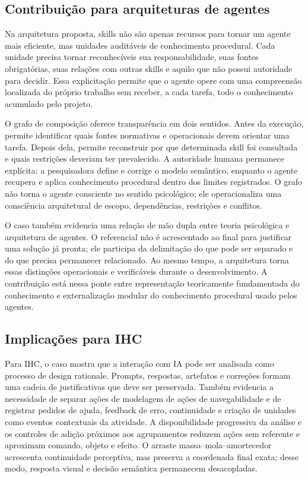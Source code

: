 \documentclass[preprint,12pt,authoryear]{elsarticle}
\begin{document}
\subsection{Contribuição para arquiteturas de agentes}

Na arquitetura proposta, skills não são apenas recursos para tornar um agente mais eficiente, mas unidades auditáveis de conhecimento procedural. Cada unidade precisa tornar reconhecíveis sua responsabilidade, suas fontes obrigatórias, suas relações com outras skills e aquilo que não possui autoridade para decidir. Essa explicitação permite que o agente opere com uma compreensão localizada do próprio trabalho sem receber, a cada tarefa, todo o conhecimento acumulado pelo projeto.

O grafo de composição oferece transparência em dois sentidos. Antes da execução, permite identificar quais fontes normativas e operacionais devem orientar uma tarefa. Depois dela, permite reconstruir por que determinada skill foi consultada e quais restrições deveriam ter prevalecido. A autoridade humana permanece explícita: a pesquisadora define e corrige o modelo semântico, enquanto o agente recupera e aplica conhecimento procedural dentro dos limites registrados. O grafo não torna o agente consciente no sentido psicológico; ele operacionaliza uma consciência arquitetural de escopo, dependências, restrições e conflitos.

O caso também evidencia uma relação de mão dupla entre teoria psicológica e arquitetura de agentes. O referencial não é acrescentado ao final para justificar uma solução já pronta; ele participa da delimitação do que pode ser separado e do que precisa permanecer relacionado. Ao mesmo tempo, a arquitetura torna essas distinções operacionais e verificáveis durante o desenvolvimento. A contribuição está nessa ponte entre representação teoricamente fundamentada do conhecimento e externalização modular do conhecimento procedural usado pelos agentes.

\subsection{Implicações para IHC}
Para IHC, o caso mostra que a interação com IA pode ser analisada como processo de design rationale. Prompts, respostas, artefatos e correções formam uma cadeia de justificativas que deve ser preservada. Também evidencia a necessidade de separar ações de modelagem de ações de navegabilidade e de registrar pedidos de ajuda, feedback de erro, continuidade e criação de unidades como eventos contextuais da atividade. A disponibilidade progressiva da análise e os controles de adição próximos aos agrupamentos reduzem ações sem referente e aproximam comando, objeto e efeito. O arraste massa--mola--amortecedor acrescenta continuidade perceptiva, mas preserva a coordenada final exata; desse modo, resposta visual e decisão semântica permanecem desacopladas.
\end{document}
